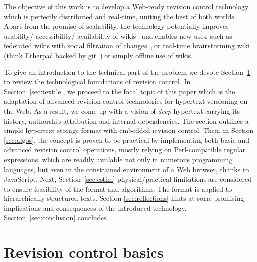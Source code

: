 \documentclass{sig-alternate}
\begin{document}
The objective of this work is to develop a Web-ready revision control technology which is perfectly distributed and real-time, uniting the best of both worlds.
Apart from the promise of scalability, the technology potentially improves usability/ accessibility/ availability of wikis~\cite{nahaboo} and enables new uses, such as federated wikis with social filtration of changes~\cite{www06}, or real-time brainstorming wiki (think Etherpad backed by git~\cite{git}) or simply offline use of wikis.

To give an introduction to the technical part of the problem we devote Section~\ref{sec:scm} to review the technological foundations of revision control. 
In Section~\ref{sec:textile}, we proceed to the focal topic of this paper which is the adaptation of advanced revision control technologies for hypertext versioning on the Web. As a result, we come up with a vision of \emph{deep} hypertext carrying its history, authorship attribution and internal dependencies.
The section outlines a simple hypertext storage format with embedded revision control.
Then, in Section \ref{sec:algos}, the concept is proven to be practical by implementing both basic and advanced revision control operations, mostly relying on Perl-compatible regular expressions, which are readily available not only in numerous programming languages, but even in the constrained environment of a Web browser, thanks to JavaScript.
Next, Section~\ref{sec:estim} physical/practical limitations are considered to ensure feasibility of the format and algorithms.
The format is applied to hierarchically structured texts.
Section \ref{sec:reflections} hints at some promising implications and consequences of the introduced technology.
Section~\ref{sec:conclusion} concludes.



\section{Revision control basics} \label{sec:scm}
\end{document}
